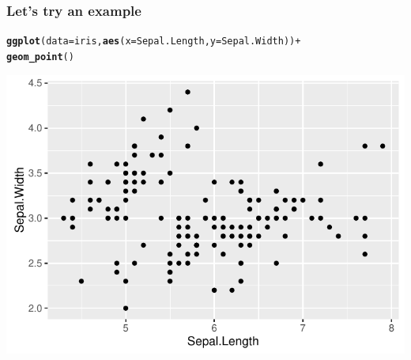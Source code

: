 \documentclass{beamer}\usepackage[]{graphicx}\usepackage[]{color}
\makeatletter
\newcommand{\hlopt}[1]{\textcolor[rgb]{0,0,0}{#1}}%
\newcommand{\hlstd}[1]{\textcolor[rgb]{0.345,0.345,0.345}{#1}}%
\newcommand{\hlkwc}[1]{\textcolor[rgb]{0.333,0.667,0.333}{#1}}%
\newcommand{\hlkwd}[1]{\textcolor[rgb]{0.737,0.353,0.396}{\textbf{#1}}}%
\newenvironment{kframe}{%
 \def\at@end@of@kframe{}%
 \ifinner\ifhmode%
  \def\at@end@of@kframe{\end{minipage}}%
  \begin{minipage}{\columnwidth}%
 \fi\fi%
 \def\FrameCommand##1{\hskip\@totalleftmargin \hskip-\fboxsep
 \colorbox{shadecolor}{##1}\hskip-\fboxsep
     \hskip-\linewidth \hskip-\@totalleftmargin \hskip\columnwidth}%
 \MakeFramed {\advance\hsize-\width
   \@totalleftmargin\z@ \linewidth\hsize
   \@setminipage}}%
 {\par\unskip\endMakeFramed%
 \at@end@of@kframe}
\newenvironment{knitrout}{}{} %
\makeatother
\begin{document}
\begin{frame}[fragile]
\frametitle{Let's try an example}
\begin{knitrout}\footnotesize
{}\color{fgcolor}\begin{kframe}
\begin{alltt}
\hlkwd{ggplot}\hlstd{(}\hlkwc{data} \hlstd{= iris,} \hlkwd{aes}\hlstd{(}\hlkwc{x} \hlstd{= Sepal.Length,} \hlkwc{y} \hlstd{= Sepal.Width))} \hlopt{+}
    \hlkwd{geom_point}\hlstd{()}
\end{alltt}
\end{kframe}

{\centering \includegraphics[width=.75\linewidth]{figure/first_plot-1} 

}



\end{knitrout}
\end{frame}

\end{document}
